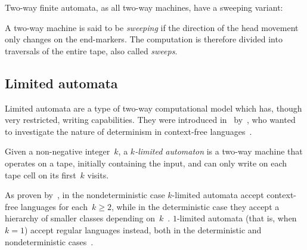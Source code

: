 Two-way finite automata, as all two-way machines, have a sweeping variant:
\begin{defn}\label{def:sweeping}
	A two-way machine is said to be \emph{sweeping} if the direction of the head movement only changes on the end-markers.
	The computation is therefore divided into traversals of the entire tape, also called \emph{sweeps}.
\end{defn}


\subsection{Limited automata}
Limited automata are a type of two-way computational model which has, though very restricted, writing capabilities.
They were introduced in~\citeyear{Hib67} by~\citeauthor{Hib67}, who wanted to investigate the nature of determinism in context-free languages~\cite{Hib67}.

Given a non-negative integer~$k$, a \emph{$k$-limited automaton} is a two-way machine that operates on a tape, initially containing the input, and can only write on each tape cell on its first~$k$ visits.

As proven by~\citeauthor{Hib67}, in the nondeterministic case $k$-limited automata accept context-free languages for each~$k\ge2$, while in the deterministic case they accept a hierarchy of smaller classes depending on~$k$~\cite{Hib67}.
$1$-limited automata (that is, when~$k=1$) accept regular languages instead, both in the deterministic and nondeterministic cases~\cite{WagWec86}.

